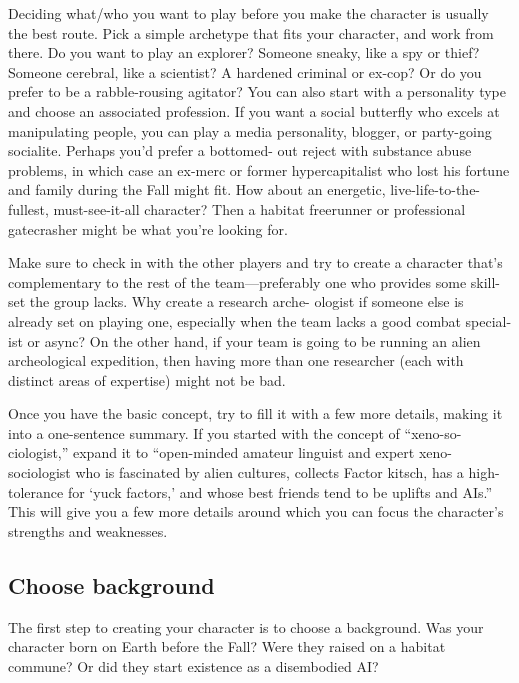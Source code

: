   Deciding what/who you want to play before you make
  the character is usually the best route. Pick a simple
  archetype that fits your character, and work from there.
  Do you want to play an explorer? Someone sneaky,
  like a spy or thief? Someone cerebral, like a scientist?
  A hardened criminal or ex-cop? Or do you prefer to
  be a rabble-rousing agitator? You can also start with a
  personality type and choose an associated profession. If
  you want a social butterfly who excels at manipulating
  people, you can play a media personality, blogger, or
  party-going socialite. Perhaps you’d prefer a bottomed-
  out reject with substance abuse problems, in which
  case an ex-merc or former hypercapitalist who lost
  his fortune and family during the Fall might fit. How
  about an energetic, live-life-to-the-fullest, must-see-it-all
  character? Then a habitat freerunner or professional
  gatecrasher might be what you’re looking for.

  Make sure to check in with the other players and
  try to create a character that’s complementary to the
  rest of the team—preferably one who provides some
  skill-set the group lacks. Why create a research arche-
  ologist if someone else is already set on playing one,
  especially when the team lacks a good combat special-
  ist or async? On the other hand, if your team is going
  to be running an alien archeological expedition, then
  having more than one researcher (each with distinct
  areas of expertise) might not be bad.

  Once you have the basic concept, try to fill it with
  a few more details, making it into a one-sentence
 summary. If you started with the concept of “xeno-so-
 ciologist,” expand it to “open-minded amateur linguist
 and expert xeno-sociologist who is fascinated by alien
 cultures, collects Factor kitsch, has a high-tolerance
 for ‘yuck factors,’ and whose best friends tend to be
 uplifts and AIs.” This will give you a few more details
 around which you can focus the character’s strengths
 and weaknesses.




\subsection{Choose background}
 The first step to creating your character is to choose a
 background. Was your character born on Earth before
 the Fall? Were they raised on a habitat commune? Or
 did they start existence as a disembodied AI?

